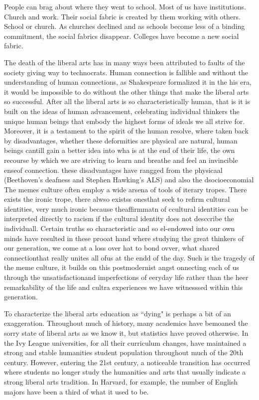 \documentclass[12pt,letterpaper]{article}
\begin{document}
People can brag about where they went to school.  Most of us have institutions.  Church and work.  Their social fabric is created by them working with others.  School or church.  As churches declined and as schools become less of a binding commitment, the social fabrics disappear.  Colleges have become a new social fabric.  



The death of the liberal arts has in many ways been attributed to faults of the society giving way to technocrats.  Human connection is fallible and without the understanding of human connections, as Shakespeare formalized it in the his era, it would be impossible to do without the other things that make the liberal arts so successful.  After all the liberal arts is so characteristically human, that is it is built on the ideas of human advancement, celebrating individual thinkers the unique human beings that embody the highest forms of ideals we all strive for.  Moreover, it is a testament to the spirit of the human resolve, where taken back by disadvantages, whether these deformities are physical are natural, human beings cantill gain a better idea into wha is at the end of their life, the own recourse by which we are striving to learn and breathe and feel an invincible enseof connection.  these disadvantages have rangged from the physicaal (Beethoven's deafness and Stephen Hawking's ALS) and also the dsocioeconomial 
The memes culture often employ a wide arsena of tools of iterary tropes.  There exists the ironic trope, there alwso existss onesthat seek to refirm cultural identities, very much ironic because theaffirmmatn of ccultural identities can be interpreted directly to racism if the cultural identity does  not desccribe the individuall.  Certain truths so characteristic and so el-endowed into our own minds have resulted in these prooat hand where studying the great thinkers of our generation, we come at a loss over hat to bond ovver, what shared connectionthat really unites all ofus at the endd of the day.  Such is the tragedy of the meme culture, it builds on this postmodernist angst onnecting each of us through the unsatisfactionand imperfections of eeryday life  rather than  the heer remarkability  of the life and cultra experiences we have witnesssed within  this generation.  

To characterize the liberal arts education as ``dying" is perhaps a bit of an exaggeration.  Throughout much of history, many academics have bemoaned the sorry state of liberal arts as we know it, but statistics have proved otherwise.  In the Ivy League universities, for all their curriculum changes, have maintained a strong and stable humanities student population throughout much of the 20th century.  However, entering the 21st century, a noticeable transition has occurred where students no longer study the humanities and arts that usually indicate a strong liberal arts tradition.  In Harvard, for example, the number of English majors have been a third of what it used to be.   
\end{document}

